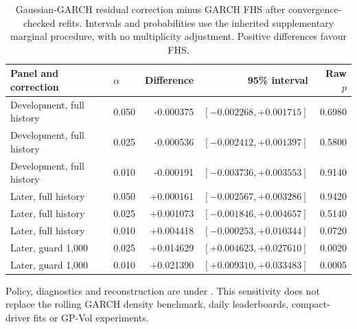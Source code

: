 \begin{table}[htbp]
\centering\small
\caption[New optimiser sensitivity against FHS]{Gaussian-GARCH residual correction minus GARCH FHS after convergence-checked refits. Intervals and probabilities use the inherited supplementary marginal procedure, with no multiplicity adjustment. Positive differences favour FHS.}
\label{tab:optimizer-fhs-sensitivity}
\begin{tabular}{llrrr}
\toprule
Panel and correction & $\alpha$ & Difference & 95\% interval & Raw $p$ \\
\midrule
Development, full history & 0.050 & -0.000375 & $[-0.002268,+0.001715]$ & 0.6980 \\
Development, full history & 0.025 & -0.000536 & $[-0.002412,+0.001397]$ & 0.5800 \\
Development, full history & 0.010 & -0.000191 & $[-0.003736,+0.003553]$ & 0.9140 \\
Later, full history & 0.050 & +0.000161 & $[-0.002567,+0.003286]$ & 0.9420 \\
Later, full history & 0.025 & +0.001073 & $[-0.001846,+0.004657]$ & 0.5140 \\
Later, full history & 0.010 & +0.004418 & $[-0.000253,+0.010344]$ & 0.0720 \\
\midrule
Later, guard 1,000 & 0.025 & +0.014629 & $[+0.004623,+0.027610]$ & 0.0020 \\
Later, guard 1,000 & 0.010 & +0.021390 & $[+0.009310,+0.033483]$ & 0.0005 \\
\bottomrule
\end{tabular}
\end{table}

Policy, diagnostics and reconstruction are under . This sensitivity does not replace the rolling GARCH density benchmark, daily leaderboards, compact-driver fits or GP-Vol experiments.
